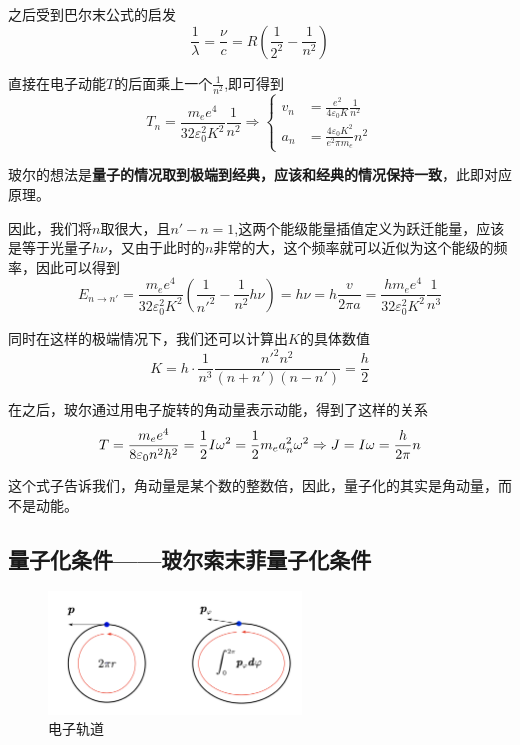 \documentclass{article}
\begin{document}
之后受到巴尔末公式的启发
\begin{equation*}
    \frac{1}{\lambda}=\frac{\nu}{c}=R\left(\frac{1}{2^2}-\frac{1}{n^2}\right)
\end{equation*}

直接在电子动能$T$的后面乘上一个$\displaystyle \frac{1}{n^2}$,即可得到
\begin{equation*}
    T_n = \frac{m_ee^4}{32\varepsilon_0^2K^2}\frac{1}{n^2}
    \Rightarrow
    \begin{cases}
        v_n & = \frac{e^2}{4\varepsilon_0K}\frac{1}{n^2} \\
        a_n & = \frac{4\varepsilon_0K^2}{e^2\pi m_e}n^2
    \end{cases}
\end{equation*}

玻尔的想法是\textbf{量子的情况取到极端到经典，应该和经典的情况保持一致}，此即对应原理。

因此，我们将$n$取很大，且$n'-n=1$,这两个能级能量插值定义为跃迁能量，应该是等于光量子$h\nu$，又由于此时的$n$非常的大，这个频率就可以近似为这个能级的频率，因此可以得到
\begin{equation*}
    E_{n\to n'} = \frac{m_ee^4}{32\varepsilon_0^2K^2}\left(\frac{1}{{n'}^2}-\frac{1}{n^2}h\nu\right)=h\nu=h\frac{v}{2\pi a}=\frac{hm_ee^4}{32\varepsilon_0^2K^2}\frac{1}{n^3}
\end{equation*}

同时在这样的极端情况下，我们还可以计算出$K$的具体数值
\[
    K=h\cdot\frac{1}{n^3}\frac{{n'}^2n^2}{(n+n')(n-n')}=\frac{h}{2}
\]

在之后，玻尔通过用电子旋转的角动量表示动能，得到了这样的关系
\begin{equation*}
    T = \frac{m_ee^4}{8\varepsilon_0n^2h^2}=\frac{1}{2}I\omega^2=\frac{1}{2}m_ea_n^2\omega^2\\
    \Rightarrow J=I\omega=\frac{h}{2\pi}n
\end{equation*}

这个式子告诉我们，角动量是某个数的整数倍，因此，量子化的其实是角动量，而不是动能。

\subsection{量子化条件——玻尔索末菲量子化条件}
\begin{figure}[!h]
    \centering
    \includegraphics[width=0.6\textwidth]{figure/电子轨道.png}
    \caption{电子轨道}
\end{figure}
\end{document}

